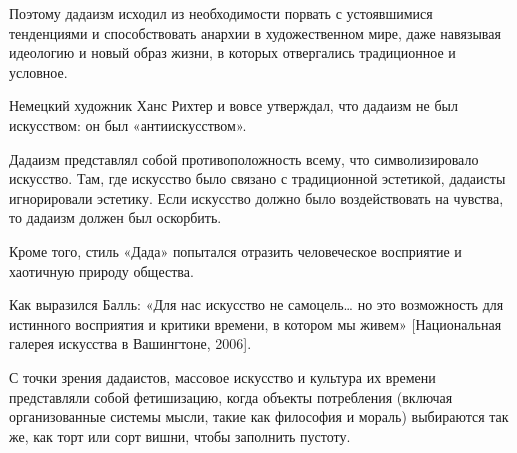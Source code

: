 Поэтому дадаизм исходил из необходимости порвать с устоявшимися тенденциями и способствовать анархии в художественном мире, даже навязывая идеологию и новый образ жизни, в которых отвергались традиционное и условное.

Немецкий художник Ханс Рихтер и вовсе утверждал, что дадаизм не был искусством: он был «антиискусством».

Дадаизм представлял собой противоположность всему, что символизировало искусство. Там, где искусство было связано с традиционной эстетикой, дадаисты игнорировали эстетику. Если искусство должно было воздействовать на чувства, то дадаизм должен был оскорбить.

Кроме того, стиль «Дада» попытался отразить человеческое восприятие и хаотичную природу общества.

Как выразился Балль: «Для нас искусство не самоцель… но это возможность для истинного восприятия и критики времени, в котором мы живем» [Национальная галерея искусства в Вашингтоне, 2006].

С точки зрения дадаистов, массовое искусство и культура их времени представляли собой фетишизацию, когда объекты потребления (включая организованные системы мысли, такие как философия и мораль) выбираются так же, как торт или сорт вишни, чтобы заполнить пустоту.

